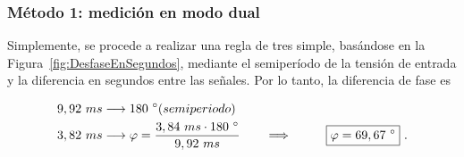     \subsubsection*{Método 1: medición en modo dual}
    Simplemente, se procede a realizar una regla de tres simple, basándose en la Figura~\ref{fig:DesfaseEnSegundos}, mediante el
    semiperíodo de la tensión de entrada y la diferencia en segundos entre las señales. Por lo tanto, la diferencia de
    fase es

    \begin{align*}
      9,92\ ms &\longrightarrow 180\ ^{\circ} (semiperiodo) \\
      3,82\ ms &\longrightarrow \varphi = \dfrac{3,84\ ms \cdot 180\ ^{\circ}}{9,92\ ms} \hspace{20pt} \Longrightarrow \hspace{20pt} \Aboxed{\varphi=69,67\ ^{\circ}}\ .
    \end{align*}

